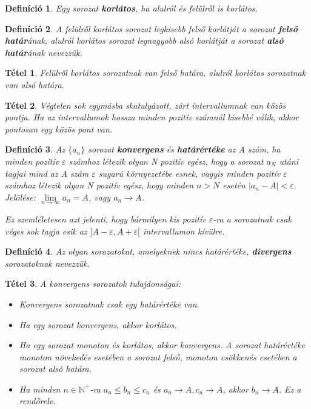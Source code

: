 \documentclass[12pt,a4paper]{article}
\newtheorem{theorem}{Tétel} [section]
\newtheorem{definition}{Definíció} [section]
\begin{document}
\begin{definition}
 Egy sorozat \textbf{korlátos}, ha alulról és felülről is korlátos.
\end{definition}

\begin{definition}
A felülről korlátos sorozat legkisebb felső korlátját a sorozat \textbf{felső határ}ának, alulról korlátos sorozat legnagyobb alsó korlátját a sorozat \textbf{alsó határ}ának nevezzük.
\end{definition}

\begin{theorem}
 Felülről korlátos sorozatnak van felső határa, alulról korlátos sorozatnak van alsó határa.
\end{theorem}

\begin{theorem}
Végtelen sok egymásba skatulyázott, zárt intervallumnak van közös pontja. Ha az intervallumok hossza minden pozitív számnál kisebbé válik, akkor pontosan egy közös pont van.
\end{theorem}

\begin{definition}
Az $\{a_n\}$ sorozat \textbf{konvergens} és \textbf{határértéke} az A szám, ha minden pozitív $\varepsilon$ számhoz létezik olyan N pozitív egész, hogy a sorozat $a_N$ utáni tagjai mind az A szám $\varepsilon$ sugarú környezetébe esnek, vagyis minden pozitív $\varepsilon$ számhoz létezik olyan N pozitív egész, hogy minden $n > N$ esetén $|a_n - A|<\varepsilon$. Jelölése: $\lim\limits_{n \to \infty} a_n=A$, vagy $a_n \to A$.

Ez szemléletesen azt jelenti, hogy bármilyen kis pozitív $\varepsilon$-ra a sorozatnak csak véges sok tagja esik az $]A - \varepsilon, A + \varepsilon[$ intervallumon kívülre.
\end{definition}

\begin{definition}
Az olyan sorozatokat, amelyeknek nincs határértéke, \textbf{divergens} sorozatoknak nevezzük.
\end{definition}

\begin{theorem}
A konvergens sorozatok tulajdonságai:
\begin{itemize}
\item Konvergens sorozatnak csak egy határértéke van.
\item Ha egy sorozat konvergens, akkor korlátos.
\item Ha egy sorozat monoton és korlátos, akkor konvergens. A sorozat határértéke monoton növekedés esetében a sorozat felső, monoton csökkenés esetében a sorozat alsó határa.
\item Ha minden $n\in \mathbb{N}^+$-ra $a_n\leq b_n \leq c_n$ és $a_n\to A, c_n\to A$, akkor $b_n\to A$. Ez a 
rendőrelv.
\end{itemize}
\end{theorem}
\end{document}

